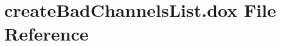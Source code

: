 \hypertarget{create_bad_channels_list_8dox}{
\section{createBadChannelsList.dox File Reference}
\label{create_bad_channels_list_8dox}
}
